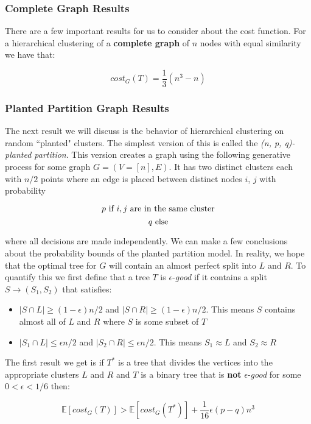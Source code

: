 \documentclass{article}
\begin{document}
\subsubsection{Complete Graph Results}

There are a few important results for us to consider about the cost function. For a hierarchical clustering of a \textbf{complete graph} of $n$ nodes with equal similarity we have that:


$$cost_G(T) = \frac{1}{3}(n^3 - n)$$

\subsubsection{Planted Partition Graph Results}

The next result we will discuss is the behavior of hierarchical clustering on random ``planted" clusters. The simplest version of this is called the \textit{(n, p, q)-planted partition}. This version creates a graph using the following generative process for some graph $G = (V = [n], E)$. It has two distinct clusters each with $n/2$ points where an edge is placed between distinct nodes $i$, $j$ with probability

$$p \hbox{ if } i, j \hbox{ are in the same cluster}$$
$$q \hbox{ else}$$

where all decisions are made independently. We can make a few conclusions about the probability bounds of the planted partition model. In reality, we hope that the optimal tree for $G$ will contain an almost perfect split into $L$ and $R$. To quantify this we first define that a tree $T$ is $\epsilon$-\textit{good} if it contains a split $S \rightarrow (S_1, S_2)$ that satisfies:

\begin{itemize}
  \item $|S \cap L| \geq (1 - \epsilon) n/2$ and $|S \cap R| \geq (1 - \epsilon) n/2$. This means $S$ contains almost all of $L$ and $R$ where $S$ is some subset of $T$
  \item $|S_1 \cap L| \leq \epsilon n/2$ and $|S_2 \cap R| \leq \epsilon n/2$. This means $S_1 \approx L$ and $S_2 \approx R$
\end{itemize}

The first result we get is if $T^*$ is a tree that divides the vertices into the appropriate clusters $L$ and $R$ and $T$ is a binary tree that is \textbf{not} $\epsilon$-\textit{good} for some $0 < \epsilon < 1/6$ then:

$$\mathbb{E}[cost_G(T)] > \mathbb{E}[cost_G(T^*)] + \frac{1}{16} \epsilon (p - q) n^3$$
\end{document}
